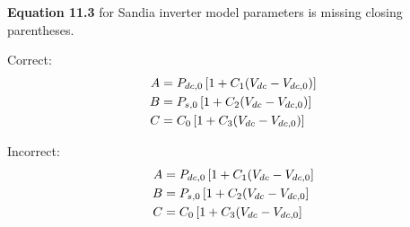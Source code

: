 \documentclass[report]{nrel}
\begin{document}
\textbf{Equation 11.3} for Sandia inverter model parameters is missing closing parentheses.

Correct:
\begin{align*}
A &=P_{dc,0} \left[ 1+ C_1 ( V_{dc} - V_{dc,0} )\right] \notag\\
B &= P_{s,0}  \left[ 1+ C_2 ( V_{dc} - V_{dc,0} )\right] \notag\\
C &= C_0  \left[ 1+ C_3 ( V_{dc} - V_{dc,0} )\right]
\end{align*}

Incorrect:
\begin{align*}
A &=P_{dc,0} \left[ 1+ C_1 ( V_{dc} - V_{dc,0}\right] \notag\\
B &= P_{s,0}  \left[ 1+ C_2 ( V_{dc} - V_{dc,0}\right] \notag\\
C &= C_0  \left[ 1+ C_3 ( V_{dc} - V_{dc,0}\right]
\end{align*}
\end{document}

